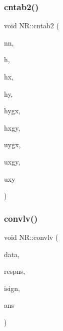 \subsubsection{\texorpdfstring{cntab2()}{cntab2()}}
{\footnotesize\ttfamily void N\+R\+::cntab2 (\begin{DoxyParamCaption}\item[{\mbox{\hyperlink{namespaceNR_a1e59f4068736f6f8a60d68e927e65a08}{Mat\+\_\+\+I\+\_\+\+I\+NT}} \&}]{nn,  }\item[{\mbox{\hyperlink{namespaceNR_af6ff762dd605ff477b8e52387253a02a}{DP}} \&}]{h,  }\item[{\mbox{\hyperlink{namespaceNR_af6ff762dd605ff477b8e52387253a02a}{DP}} \&}]{hx,  }\item[{\mbox{\hyperlink{namespaceNR_af6ff762dd605ff477b8e52387253a02a}{DP}} \&}]{hy,  }\item[{\mbox{\hyperlink{namespaceNR_af6ff762dd605ff477b8e52387253a02a}{DP}} \&}]{hygx,  }\item[{\mbox{\hyperlink{namespaceNR_af6ff762dd605ff477b8e52387253a02a}{DP}} \&}]{hxgy,  }\item[{\mbox{\hyperlink{namespaceNR_af6ff762dd605ff477b8e52387253a02a}{DP}} \&}]{uygx,  }\item[{\mbox{\hyperlink{namespaceNR_af6ff762dd605ff477b8e52387253a02a}{DP}} \&}]{uxgy,  }\item[{\mbox{\hyperlink{namespaceNR_af6ff762dd605ff477b8e52387253a02a}{DP}} \&}]{uxy }\end{DoxyParamCaption})}

\mbox{\label{namespaceNR_a2082dd6448479336557410a290a17c2c}} 
\subsubsection{\texorpdfstring{convlv()}{convlv()}}
{\footnotesize\ttfamily void N\+R\+::convlv (\begin{DoxyParamCaption}\item[{\mbox{\hyperlink{namespaceNR_a9f943da53862537c552e2a770cb170ae}{Vec\+\_\+\+I\+\_\+\+DP}} \&}]{data,  }\item[{\mbox{\hyperlink{namespaceNR_a9f943da53862537c552e2a770cb170ae}{Vec\+\_\+\+I\+\_\+\+DP}} \&}]{respns,  }\item[{const int}]{isign,  }\item[{\mbox{\hyperlink{namespaceNR_a970094d23441f8ef6a45282a7eb2103d}{Vec\+\_\+\+O\+\_\+\+DP}} \&}]{ans }\end{DoxyParamCaption})}

